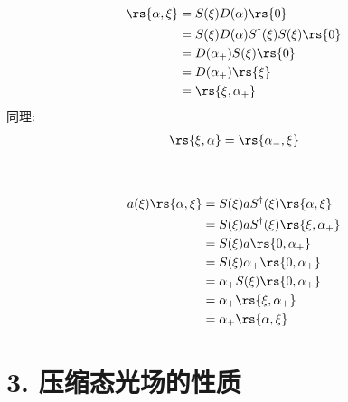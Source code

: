     \begin{frame}
     \frametitle{} 

        \[\begin{aligned}
            \rs{\alpha,\xi } & = S(\xi) D(\alpha) \rs{0}  \\ 
            &= S(\xi) D(\alpha)S^\dagger (\xi) S(\xi) \rs{0} \\ 
            &= D(\alpha_{+}) S(\xi) \rs{0} \\ 
            &= D(\alpha_{+}) \rs{\xi} \\ 
            &= \rs{\xi, \alpha_{+}} 
        \end{aligned} \]
        同理: 
        \[\begin{aligned}
            \rs{\xi, \alpha }& = \rs{\alpha_{-},\xi} \\
        \end{aligned} \]
    \end{frame}
    
    \begin{frame}
          \frametitle{}
          \例 [4.试证明相干压缩态满足本征方程]{ ~\\ \[  \boxed{a(\xi) \rs{\alpha, \xi}= \alpha_{+}  \rs{\alpha, \xi}}\]}
    \证~
    \[\begin{aligned}
        a(\xi) \rs{\alpha, \xi} &= S(\xi) a S ^\dagger (\xi) \rs{\alpha, \xi}  \\ 
        &= S(\xi) a S ^\dagger (\xi) \rs{\xi, \alpha_{+}}  \\ 
        &= S (\xi)  a  \rs{0, \alpha_{+}} \\ 
        &= S (\xi) \alpha_{+}  \rs{0, \alpha_{+}} \\ 
        &= \alpha_{+} S (\xi)  \rs{0, \alpha_{+}} \\ 
        &= \alpha_{+}  \rs{\xi, \alpha_{+}} \\ 
        &= \alpha_{+}  \rs{\alpha, \xi}  
    \end{aligned} \]
   \end{frame}

\section{3. 压缩态光场的性质}

